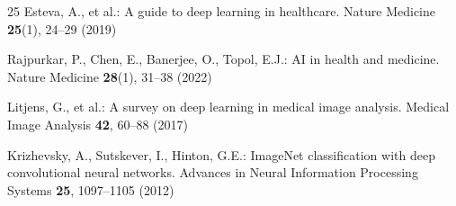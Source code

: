 \documentclass[runningheads]{llncs}
\begin{document}
\begin{thebibliography}{25}
Esteva, A., et al.: A guide to deep learning in healthcare. Nature Medicine \textbf{25}(1), 24--29 (2019)

Rajpurkar, P., Chen, E., Banerjee, O., Topol, E.J.: AI in health and medicine. Nature Medicine \textbf{28}(1), 31--38 (2022)

Litjens, G., et al.: A survey on deep learning in medical image analysis. Medical Image Analysis \textbf{42}, 60--88 (2017)

Krizhevsky, A., Sutskever, I., Hinton, G.E.: ImageNet classification with deep convolutional neural networks. Advances in Neural Information Processing Systems \textbf{25}, 1097--1105 (2012)

\end{thebibliography}
\end{document}

